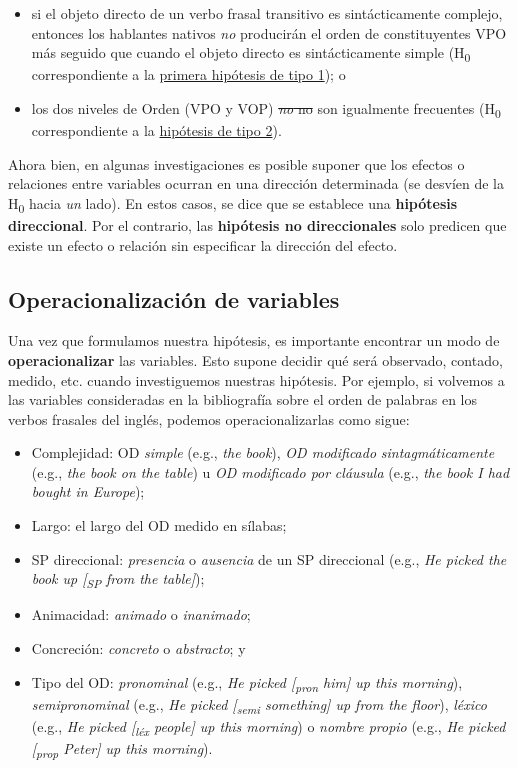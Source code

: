 \documentclass[12pt,spanish,a4paper,]{article}
\providecommand{\tightlist}{%
  \setlength{\itemsep}{0pt}\setlength{\parskip}{0pt}}
\begin{document}
\begin{itemize}
\tightlist
\item
  si el objeto directo de un verbo frasal transitivo es sintácticamente
  complejo, entonces los hablantes nativos \emph{no} producirán el orden
  de constituyentes VPO más seguido que cuando el objeto directo es
  sintácticamente simple (H\textsubscript{0} correspondiente a la
  \protect\hyperlink{h1}{primera hipótesis de tipo 1}); o
\item
  los dos niveles de Orden (VPO y VOP) \sout{\emph{no} no} son
  igualmente frecuentes (H\textsubscript{0} correspondiente a la
  \protect\hyperlink{h2}{hipótesis de tipo 2}).
\end{itemize}

Ahora bien, en algunas investigaciones es posible suponer que los
efectos o relaciones entre variables ocurran en una dirección
determinada (se desvíen de la H\textsubscript{0} hacia \emph{un} lado).
En estos casos, se dice que se establece una \textbf{hipótesis
direccional}. Por el contrario, las \textbf{hipótesis no direccionales}
solo predicen que existe un efecto o relación sin especificar la
dirección del efecto.

\hypertarget{operacionalizacion-de-variables}{%
\subsection{Operacionalización de
variables}\label{operacionalizacion-de-variables}}

Una vez que formulamos nuestra hipótesis, es importante encontrar un
modo de \textbf{operacionalizar} las variables. Esto supone decidir qué
será observado, contado, medido, etc. cuando investiguemos nuestras
hipótesis. Por ejemplo, si volvemos a las variables consideradas en la
bibliografía sobre el orden de palabras en los verbos frasales del
inglés, podemos operacionalizarlas como sigue:

\begin{itemize}
\tightlist
\item
  Complejidad: OD \emph{simple} (e.g., \emph{the book}), \emph{OD
  modificado} \emph{sintagmáticamente} (e.g., \emph{the book on the
  table}) u \emph{OD modificado por} \emph{cláusula} (e.g., \emph{the
  book I had bought in Europe});
\item
  Largo: el largo del OD medido en sílabas;
\item
  SP direccional: \emph{presencia} o \emph{ausencia} de un SP
  direccional (e.g., \emph{He picked the book up {[}\textsubscript{SP}
  from the table{]}});
\item
  Animacidad: \emph{animado} o \emph{inanimado};
\item
  Concreción: \emph{concreto} o \emph{abstracto}; y
\item
  Tipo del OD: \emph{pronominal} (e.g., \emph{He picked
  {[}\textsubscript{pron} him{]} up this morning}),
  \emph{semipronominal} (e.g., \emph{He picked {[}\textsubscript{semi}
  something{]} up from the floor}), \emph{léxico} (e.g., \emph{He picked
  {[}\textsubscript{léx} people{]} up this morning}) o \emph{nombre
  propio} (e.g., \emph{He picked {[}\textsubscript{prop} Peter{]} up
  this morning}).
\end{itemize}
\end{document}
